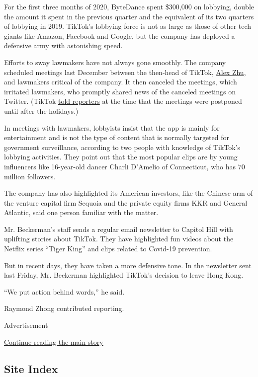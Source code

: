 For the first three months of 2020, ByteDance spent \$300,000 on
lobbying, double the amount it spent in the previous quarter and the
equivalent of its two quarters of lobbying in 2019. TikTok's lobbying
force is not as large as those of other tech giants like Amazon,
Facebook and Google, but the company has deployed a defensive army with
astonishing speed.

Efforts to sway lawmakers have not always gone smoothly. The company
scheduled meetings last December between the then-head of TikTok,
\href{https://www.nytimes.com/2019/11/18/technology/tiktok-alex-zhu-interview.html}{Alex
Zhu}, and lawmakers critical of the company. It then canceled the
meetings, which irritated lawmakers, who promptly shared news of the
canceled meetings on Twitter. (TikTok
\href{https://www.washingtonpost.com/technology/2019/12/09/tiktok-leader-postpones-trip-washington-meet-with-members-congress/}{told
reporters} at the time that the meetings were postponed until after the
holidays.)

In meetings with lawmakers, lobbyists insist that the app is mainly for
entertainment and is not the type of content that is normally targeted
for government surveillance, according to two people with knowledge of
TikTok's lobbying activities. They point out that the most popular clips
are by young influencers like 16-year-old dancer Charli D'Amelio of
Connecticut, who has 70 million followers.

The company has also highlighted its American investors, like the
Chinese arm of the venture capital firm Sequoia and the private equity
firms KKR and General Atlantic, said one person familiar with the
matter.

Mr. Beckerman's staff sends a regular email newsletter to Capitol Hill
with uplifting stories about TikTok. They have highlighted fun videos
about the Netflix series ``Tiger King'' and clips related to Covid-19
prevention.

But in recent days, they have taken a more defensive tone. In the
newsletter sent last Friday, Mr. Beckerman highlighted TikTok's decision
to leave Hong Kong.

``We put action behind words,'' he said.

Raymond Zhong contributed reporting.

Advertisement

\protect\hyperlink{after-bottom}{Continue reading the main story}

\hypertarget{site-index}{%
\subsection{Site Index}\label{site-index}}

